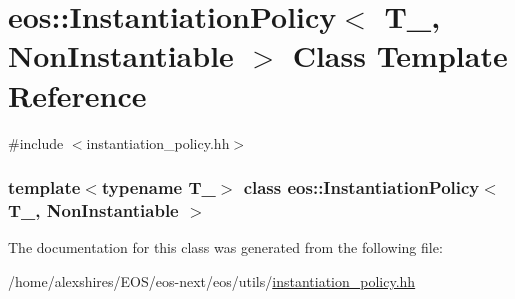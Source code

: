 \hypertarget{classeos_1_1InstantiationPolicy_3_01T___00_01NonInstantiable_01_4}{
\section{eos::InstantiationPolicy$<$ T\_\-, NonInstantiable $>$ Class Template Reference}
\label{classeos_1_1InstantiationPolicy_3_01T___00_01NonInstantiable_01_4}
}


{\ttfamily \#include $<$instantiation\_\-policy.hh$>$}\subsubsection*{template$<$typename T\_\-$>$ class eos::InstantiationPolicy$<$ T\_\-, NonInstantiable $>$}



The documentation for this class was generated from the following file:\begin{DoxyCompactItemize}
\item 
/home/alexshires/EOS/eos-\/next/eos/utils/\hyperlink{instantiation__policy_8hh}{instantiation\_\-policy.hh}\end{DoxyCompactItemize}
